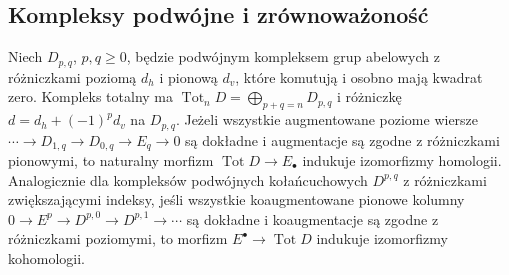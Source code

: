 \subsection{Kompleksy podwójne i zrównoważoność}
\begin{lemat}\label{cat:lem:total-acyclic}
Niech $D_{p,q}$, $p,q\ge0$, będzie podwójnym kompleksem grup abelowych z różniczkami poziomą $d_h$ i pionową $d_v$, które komutują i osobno mają kwadrat zero. Kompleks totalny ma $\operatorname{Tot}_n D=\bigoplus_{p+q=n}D_{p,q}$ i różniczkę $d=d_h+(-1)^p d_v$ na $D_{p,q}$.
Jeżeli wszystkie augmentowane poziome wiersze $\cdots\to D_{1,q}\to D_{0,q}\to E_q\to0$ są dokładne i augmentacje są zgodne z różniczkami pionowymi, to naturalny morfizm $\operatorname{Tot}D\to E_\bullet$ indukuje izomorfizmy homologii. Analogicznie dla kompleksów podwójnych kołańcuchowych $D^{p,q}$ z różniczkami zwiększającymi indeksy, jeśli wszystkie koaugmentowane pionowe kolumny $0\to E^p\to D^{p,0}\to D^{p,1}\to\cdots$ są dokładne i koaugmentacje są zgodne z różniczkami poziomymi, to morfizm $E^\bullet\to\operatorname{Tot}D$ indukuje izomorfizmy kohomologii.
\end{lemat}
